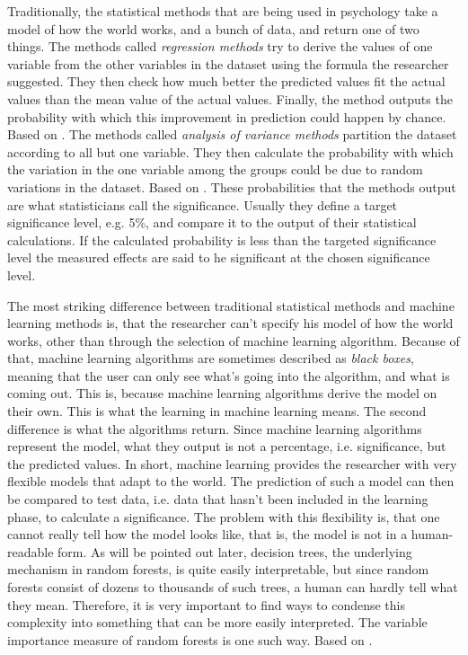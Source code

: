 \documentclass[a4paper,man,12pt,apacite]{apa6} %
\begin{document}
Traditionally, the statistical methods that are being used in psychology
take a model of how the world works, and a bunch of data, and return one of
two things.
The methods called \emph{regression methods} try to derive the values of
one variable from the other variables in the dataset using the formula the
researcher suggested. They then check how much better the predicted values
fit the actual values than the mean value of the actual values.
Finally, the method outputs the probability with which this improvement in
prediction could happen by chance.
Based on \cite{wpRA}.
The methods called \emph{analysis of variance methods} partition the dataset
according to all but one variable. They then calculate the probability with
which the variation in the one variable among the groups could be due to
random variations in the dataset.
Based on \cite{wpAOV}.
These probabilities that the methods output are what statisticians call the
significance. Usually they define a target significance level, e.g. 5\%, and
compare it to the output of their statistical calculations. If the
calculated probability is less than the targeted significance level the
measured effects are said to he significant at the chosen significance level.

The most striking difference between traditional statistical methods and
machine learning methods is, that the researcher can't specify his model of
how the world works, other than through the selection of machine learning
algorithm.
Because of that, machine learning algorithms are sometimes described as
\emph{black boxes}, meaning that the user can only see what's going into the
algorithm, and what is coming out.
This is, because machine learning algorithms derive the model on their own.
This is what the learning in machine learning means.
The second difference is what the algorithms return.
Since machine learning algorithms represent the model, what they output is
not a percentage, i.e. significance, but the predicted values.
In short, machine learning provides the researcher with very flexible models
that adapt to the world.
The prediction of such a model can then be compared to test data,
i.e. data that hasn't been included in the learning phase, to calculate a
significance.
The problem with this flexibility is, that one cannot really tell how the
model looks like, that is, the model is not in a human-readable form.
As will be pointed out later, decision trees, the underlying mechanism in
random forests, is quite easily interpretable, but since random forests
consist of dozens to thousands of such trees, a human can hardly tell what
they mean.
Therefore, it is very important to find ways to condense this complexity
into something that can be more easily interpreted.
The variable importance measure of random forests is one such way.
Based on \cite{wpML}.
\end{document}

